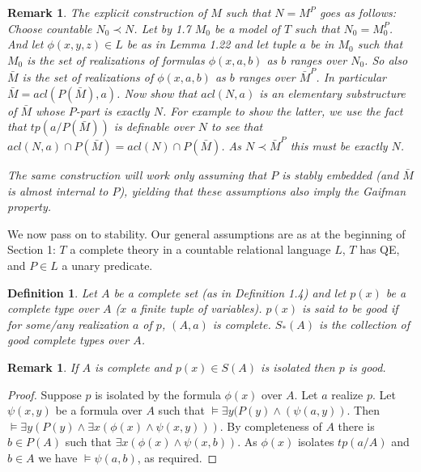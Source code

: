 \documentclass[12pt]{article}
\newtheorem{Definition}[Theorem]{Definition}
\newtheorem{Remark}[Theorem]{Remark}
\begin{document}
\begin{Remark} The explicit construction of $M$ such that $N = M^{P}$ goes as follows:  Choose countable $N_{0}\prec N$. Let  by 1.7 $M_{0}$ be a model of $T$ such that $N_{0} = M_{0}^{P}$. And let $\phi(x,y,z)\in L$ be as in Lemma 1.22 and let tuple $a$  be in $M_{0}$ such that $M_{0}$ is the set of realizations of formulas $\phi(x,a,b)$ as $b$ ranges over $N_{0}$.  So also ${\bar M}$ is the set of realizations of $\phi(x, a, b)$ as $b$ ranges over ${\bar M}^{P}$. In particular ${\bar M} = acl(P({\bar M}),a)$.  Now show that $acl(N,a)$ is an elementary substructure of ${\bar M}$ whose $P$-part is exactly $N$.  For example to show the latter, we use the fact that $tp(a/P({\bar M}))$ is definable over $N$ to see that $acl(N,a)\cap P({\bar M}) = acl(N)\cap P({\bar M})$. As $N\prec {\bar M}^{P}$ this must be exactly $N$. 

The same construction will work only assuming that $P$ is stably embedded (and ${\bar M}$ is almost internal to $P$), yielding that these assumptions also  imply the Gaifman property. 

\end{Remark}

\vspace{5mm}
\noindent
We now pass on to stability.  Our general assumptions are as at the beginning of Section 1: $T$ a complete theory in a countable relational language $L$, $T$  has QE, and $P\in L$ a unary predicate.




\begin{Definition}
Let $A$ be a complete set (as in Definition 1.4) and let $p(x)$ be a complete type over $A$ ($x$ a finite tuple of variables). $p(x)$ is said to be good if for some/any realization $a$ of $p$, $(A,a)$ is complete.
$S_{*}(A)$ is the collection of good complete types over $A$.

\end{Definition}  

\begin{Remark} If $A$ is complete and $p(x)\in S(A)$ is isolated then  $p$ is good.
\end{Remark} 
\begin{proof} Suppose $p$ is isolated by the formula $\phi(x)$ over $A$.  Let $a$ realize $p$. Let $\psi(x,y)$ be a formula over $A$ such that $\models \exists y(P(y) \wedge (\psi(a,y))$. Then 
$\models \exists y(P(y) \wedge \exists x(\phi(x)\wedge \psi(x,y)))$.  By completeness of $A$ there is $b\in P(A)$ such that $ \exists x(\phi(x)\wedge \psi(x,b))$. 
As $\phi(x)$ isolates $tp(a/A)$ and $b\in A$ we have $\models \psi(a,b)$, as required. 
\end{proof}
\end{document}
